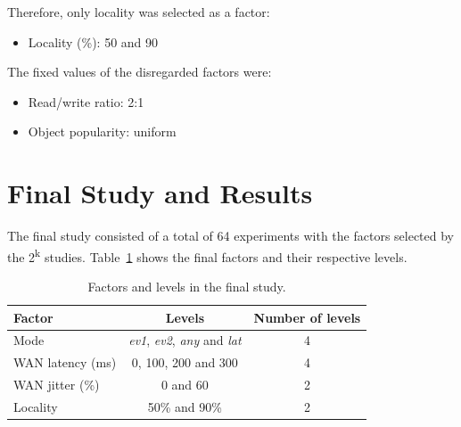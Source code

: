 \documentclass[man,floatsintext,12pt]{apa6}
\begin{document}
Therefore, only locality was selected as a factor:

\begin{itemize}

\item Locality (\%): 50 and 90

\end{itemize}

The fixed values of the disregarded factors were:

\begin{itemize}

\item Read/write ratio: 2:1

\item Object popularity: uniform

\end{itemize}

\section{Final Study and Results}

The final study consisted of a total of 64 experiments with the factors
selected by the 2\textsuperscript{k} studies.
Table~\ref{tab:fatores_e_niveis_do_estudo_final} shows the final factors and
their respective levels.

\begin{table}[h!]
\caption{Factors and levels in the final study.}
\begin{tabular}{lcc} \toprule

Factor & Levels & Number of levels\\ \midrule

Mode & \textit{ev1}, \textit{ev2}, \textit{any} and \textit{lat} & 4\\

WAN latency (ms) & 0, 100, 200 and 300 & 4\\

WAN jitter (\%) & 0 and 60 & 2\\

Locality & 50\% and 90\% & 2\\ \bottomrule

\end{tabular}

\label{tab:fatores_e_niveis_do_estudo_final}

\end{table}
\end{document}

